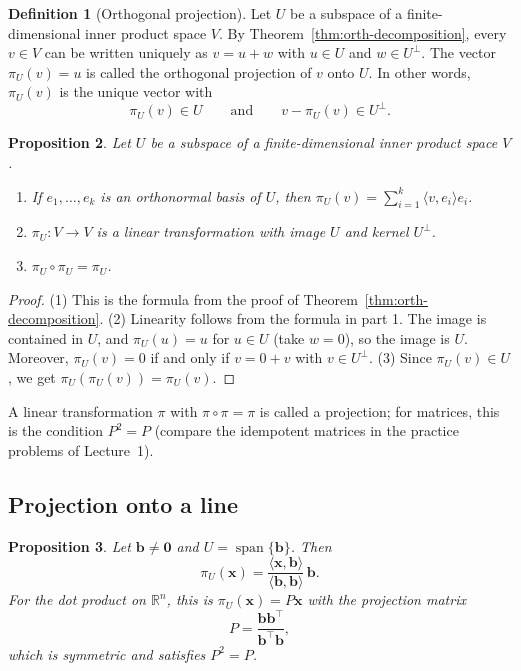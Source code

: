 \documentclass[11pt]{article}
\newcommand{\ip}[2]{\langle #1, #2 \rangle}
\theoremstyle{definition}
\newtheorem{definition}{Definition}[section]
\theoremstyle{plain}
\newtheorem{proposition}[definition]{Proposition}
\theoremstyle{remark}
\DeclareMathOperator{\Span}{span}
\begin{document}
\begin{definition}[Orthogonal projection]
    Let $U$ be a subspace of a finite-dimensional inner product space $V$. By Theorem~\ref{thm:orth-decomposition}, every $v \in V$ can be written uniquely as $v = u + w$ with $u \in U$ and $w \in U^\perp$. The vector $\pi_U(v) = u$ is called the orthogonal projection of $v$ onto $U$. In other words, $\pi_U(v)$ is the unique vector with
    \[\pi_U(v) \in U \qquad \text{and} \qquad v - \pi_U(v) \in U^\perp.\]
\end{definition}

\begin{proposition}\label{prop:projection-properties}
    Let $U$ be a subspace of a finite-dimensional inner product space $V$.
    \begin{enumerate}
        \item If $e_1, \ldots, e_k$ is an orthonormal basis of $U$, then $\pi_U(v) = \sum_{i=1}^k \ip{v}{e_i} e_i$.
        \item $\pi_U: V \to V$ is a linear transformation with image $U$ and kernel $U^\perp$.
        \item $\pi_U \circ \pi_U = \pi_U$.
    \end{enumerate}
\end{proposition}

\begin{proof}
    (1) This is the formula from the proof of Theorem~\ref{thm:orth-decomposition}. (2) Linearity follows from the formula in part 1. The image is contained in $U$, and $\pi_U(u) = u$ for $u \in U$ (take $w = 0$), so the image is $U$. Moreover, $\pi_U(v) = 0$ if and only if $v = 0 + v$ with $v \in U^\perp$. (3) Since $\pi_U(v) \in U$, we get $\pi_U(\pi_U(v)) = \pi_U(v)$.
\end{proof}

A linear transformation $\pi$ with $\pi \circ \pi = \pi$ is called a projection; for matrices, this is the condition $P^2 = P$ (compare the idempotent matrices in the practice problems of Lecture~1).

\subsection{Projection onto a line}

\begin{proposition}\label{prop:projection-line}
    Let $\mathbf{b} \neq \mathbf{0}$ and $U = \Span\{\mathbf{b}\}$. Then
    \[\pi_U(\mathbf{x}) = \frac{\ip{\mathbf{x}}{\mathbf{b}}}{\ip{\mathbf{b}}{\mathbf{b}}} \, \mathbf{b}.\]
    For the dot product on $\mathbb{R}^n$, this is $\pi_U(\mathbf{x}) = P\mathbf{x}$ with the projection matrix
    \[P = \frac{\mathbf{b} \mathbf{b}^\top}{\mathbf{b}^\top \mathbf{b}},\]
    which is symmetric and satisfies $P^2 = P$.
\end{proposition}
\end{document}

